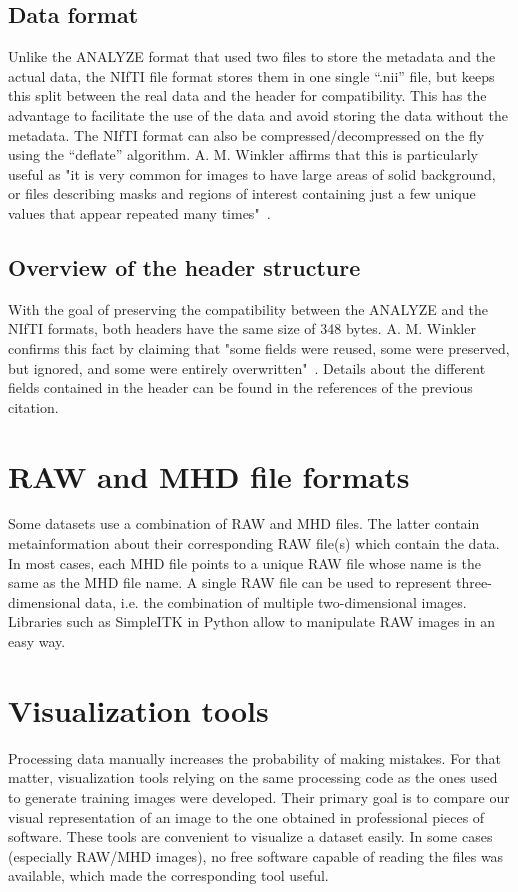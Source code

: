 \subsection{Data format}
\setlength{\marginparwidth}{3cm}\leavevmode {}Unlike the ANALYZE format that used two files to store the metadata and the actual data, the NIfTI file format stores them in one single “.nii” file, but keeps this split between the real data and the header for compatibility. This has the advantage to facilitate the use of the data and avoid storing the data without the metadata. The NIfTI format can also be compressed/decompressed on the fly using the “deflate” algorithm. A. M. Winkler affirms that this is particularly useful as "it is very common for images to have large areas of solid background, or files describing masks and regions of interest containing just a few unique values that appear repeated many times"~\cite{52}.


\subsection{Overview of the header structure}
\setlength{\marginparwidth}{3cm}\leavevmode {}With the goal of preserving the compatibility between the ANALYZE and the NIfTI formats, both headers have the same size of 348 bytes. A. M. Winkler confirms this fact by claiming that "some fields were reused, some were preserved, but ignored, and some were entirely overwritten"~\cite{52}. Details about the different fields contained in the header can be found in the references of the previous citation.


\section{RAW and MHD file formats}
\setlength{\marginparwidth}{3cm}\leavevmode {}Some datasets use a combination of RAW and MHD files. The latter contain metainformation about their corresponding RAW file(s) which contain the data. In most cases, each MHD file points to a unique RAW file whose name is the same as the MHD file name. A single RAW file can be used to represent three-dimensional data, i.e. the combination of multiple two-dimensional images. Libraries such as \mbox{SimpleITK} in Python allow to manipulate RAW images in an easy way. 



\section{Visualization tools}
\setlength{\marginparwidth}{3cm}\leavevmode {}Processing data manually increases the probability of making mistakes. For that matter, visualization tools relying on the same processing code as the ones used to generate training images were developed. Their primary goal is to compare our visual representation of an image to the one obtained in professional pieces of software. These tools are convenient to visualize a dataset easily. In some cases (especially RAW/MHD images), no free software capable of reading the files was available, which made the corresponding tool useful. 


